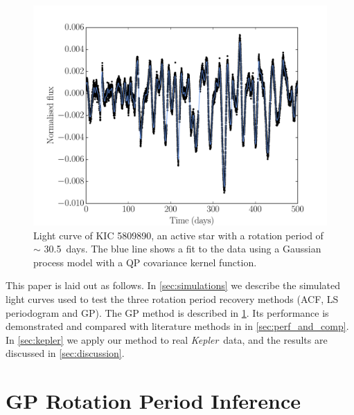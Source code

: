 \documentclass[useAMS, usenatbib, preprint, 12pt]{aastex}
\newcommand{\Kepler}{{\it Kepler}}
\newcommand{\kepler}{\Kepler}
\newcommand{\kepexample}{5809890}
\newcommand{\kepexampleperiod}{30.5}
\begin{document}
\begin{figure}
\begin{center}
\includegraphics[width=6in, clip=true]{figures/koi_lc_demo.pdf}
\caption[A light curve with a GP model.]
{Light curve of KIC \kepexample, an active star with a rotation period of
$\sim$ \kepexampleperiod\ days.
The blue line shows a fit to the data using a Gaussian process model with a QP
covariance kernel function.}
\label{fig:GP_example}
\end{center}
\end{figure}

This paper is laid out as follows.
In \textsection \ref{sec:simulations} we describe the simulated light curves
used to test the three rotation period recovery methods (ACF, LS periodogram
and GP).
The GP method is described in \textsection \ref{sec:method}.
Its performance is demonstrated and compared with literature methods in
in \textsection \ref{sec:perf_and_comp}.
In \textsection \ref{sec:kepler} we apply our method to real \kepler\ data,
and the results are discussed in \textsection \ref{sec:discussion}.

\section{GP Rotation Period Inference}
\label{sec:method}
\end{document}
